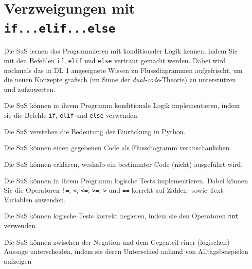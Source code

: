 \section{Verzweigungen mit \texorpdfstring{\lstinline|if...elif...else|}{if...elif...else}}
\begin{myExBox}
Die SuS lernen das Programmieren mit konditionaler Logik kennen, indem Sie mit den Befehlen \lstinline|if|, \lstinline|elif| und \lstinline|else| vertraut gemacht werden. Dabei wird nochmals das in DL 1 angeeignete Wissen zu Flussdiagrammen aufgefrischt, um die neuen Konzepte grafisch (im Sinne der \textit{dual-code}-Theorie) zu unterstützen und aufzuwerten.

\begin{todolist}
    \item Die SuS können in ihrem Programm konditionale Logik implementieren, indem sie die Befehle \lstinline|if|, \lstinline|elif| und \lstinline|else| verwenden.
    \item Die SuS verstehen die Bedeutung der Einrückung in Python.
    \item Die SuS können einen gegebenen Code als Flussdiagramm veranschaulichen.
    \item Die SuS können erklären, weshalb ein bestimmter Code (nicht) ausgeführt wird.
    \item Die SuS können in ihrem Programm logische Tests implementieren. Dabei können Sie die Operatoren \lstinline|!=|, \lstinline|<|, \lstinline|<=|, \lstinline|>=|, \lstinline|>| und \lstinline|==| korrekt auf Zahlen- sowie Text-Variablen anwenden.
    \item Die SuS können logische Tests korrekt negieren, indem sie den Operatoren \lstinline|not| verwenden.
    \item Die SuS können zwischen der Negation und dem Gegenteil einer (logischen) Aussage unterscheiden, indem sie deren Unterschied anhand von Alltagsbeispielen aufzeigen
\end{todolist}


\end{myExBox}
